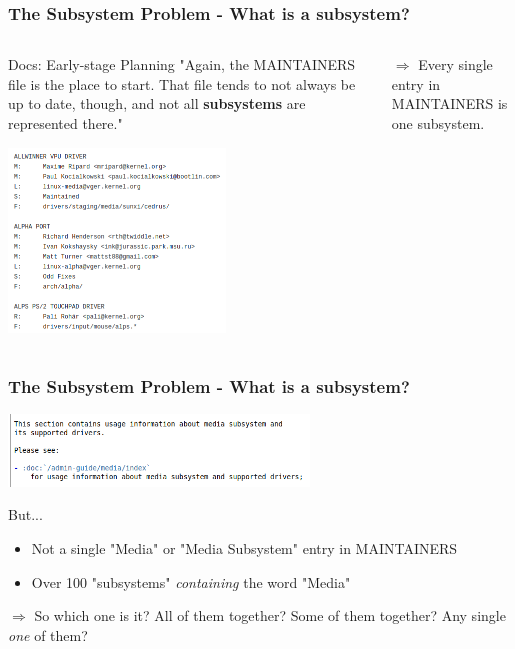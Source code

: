 \documentclass{beamer}
\begin{document}
	\begin{frame}
	\frametitle{The Subsystem Problem - What is a subsystem?}


	\begin{columns}
		\begin{column}{0.55\textwidth}
			\begin{block}{Docs: Early-stage Planning}
			"Again, the MAINTAINERS file is	the place to start.  That file tends to not always be up to date, though, and not all \textbf{subsystems} are represented there."
			\end{block}
     		\includegraphics[width=0.6\textwidth]{pics/MAINTAINERSbild.png}
		\end{column}
		\begin{column}{0.4\textwidth}
		$\Rightarrow$ Every single entry in MAINTAINERS is one subsystem.
		\end{column}
	\end{columns}
	\end{frame}


	\begin{frame}
	\frametitle{The Subsystem Problem - What is a subsystem?}
     	\includegraphics[width=0.6\textwidth]{pics/Media_subsystem.png}

	\begin{block}{But... }
		\begin{itemize}
		\item Not a single "Media" or "Media Subsystem" entry in MAINTAINERS
		\item Over 100 "subsystems" \textit{containing} the word "Media"
		\end{itemize}
	\end{block}
	$\Rightarrow$ So which one is it? All of them together? Some of them together? Any single \textit{one} of them?
	\end{frame}
\end{document}
